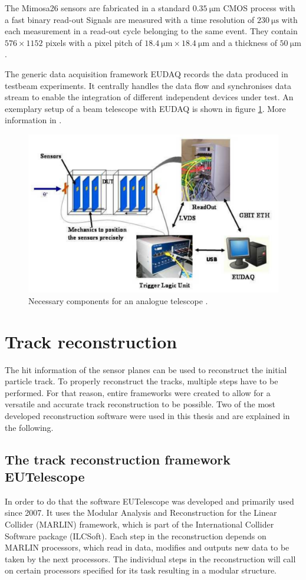 The Mimosa26 sensors are fabricated in a standard $\SI{0.35}{\micro\meter}$ CMOS process with a fast binary read-out
Signals are measured with a time resolution of $\SI{230}{\micro\second}$ with each measurement in a read-out cycle belonging to the same event.
They contain $576 \times 1152$ pixels with a pixel pitch of $\SI{18.4}{\micro\meter} \times \SI{18.4}{\micro\meter}$
and a thickness of $\SI{50}{\micro\meter}$.

The generic data acquisition framework EUDAQ records the data produced in testbeam experiments. It centrally handles the data flow and synchronises data stream to enable
the integration of different independent devices under test. An exemplary setup of a beam telescope with EUDAQ is shown in figure \ref{fig:eudaq_bild}.
More information in \cite{eudaq}.

\begin{figure}
  \centering
  \includegraphics[height=0.4\textwidth]{images/eudaq.png}
  \caption{Necessary components for an analogue telescope \cite{eudaq_bild}.}
  \label{fig:eudaq_bild}
\end{figure}

\chapter{Track reconstruction}
The hit information of the sensor planes can be used to reconstruct the initial particle track. To properly reconstruct the tracks, multiple steps have to
be performed. For that reason, entire frameworks were created to allow for a versatile and accurate track reconstruction to be possible. Two of the most
developed reconstruction software were used in this thesis and are explained in the following.

\section{The track reconstruction framework EUTelescope}
In order to do that the software EUTelescope was developed and
primarily used since 2007. It uses the Modular Analysis and Reconstruction for the Linear Collider (MARLIN) framework, which is part of the
International Collider Software package (ILCSoft). Each step in the reconstruction depends on MARLIN processors, which read in data, modifies and outputs new data to be
taken by the next processors. The individual steps in the reconstruction will call on certain processors specified for its task resulting in a
modular structure.

